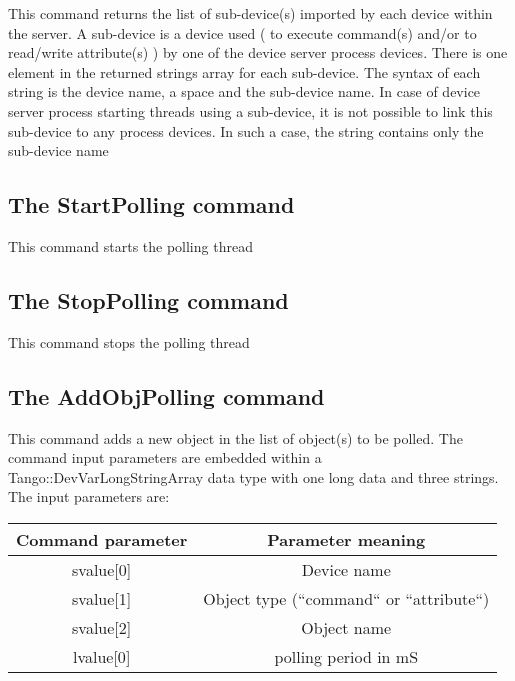 This command returns the list of sub-device(s) imported by each device
within the server. A sub-device is a device used ( to execute command(s)
and/or to read/write attribute(s) ) by one of the device server process
devices. There is one element in the returned strings array for each
sub-device. The syntax of each string is the device name, a space
and the sub-device name. In case of device server process starting
threads using a sub-device, it is not possible to link this sub-device
to any process devices. In such a case, the string contains only the
sub-device name


\subsection{The StartPolling command}

This command starts the polling thread


\subsection{The StopPolling command}

This command stops the polling thread


\subsection{The AddObjPolling command}

This command adds a new object in the list of object(s) to be polled.
The command input parameters are embedded within a Tango::DevVarLongStringArray
data type with one long data and three strings. The input parameters
are:

\vspace{0.3cm}


\begin{center}
\begin{longtable}{|c|c|}
\hline 
Command parameter & Parameter meaning\tabularnewline
\hline 
\hline 
svalue{[}0{]} & Device name\tabularnewline
\hline 
svalue{[}1{]} & Object type (``command`` or ``attribute``)\tabularnewline
\hline 
svalue{[}2{]} & Object name\tabularnewline
\hline 
lvalue{[}0{]} & polling period in mS\tabularnewline
\hline 
\end{longtable}
\par\end{center}

\vspace{0.3cm}


